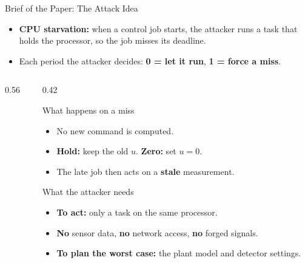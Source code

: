 \documentclass[9pt,aspectratio=169]{beamer}
\begin{document}
\begin{frame}{Brief of the Paper: The Attack Idea}
\begin{itemize}
  \item \textbf{CPU starvation:} when a control job starts, the attacker runs a task that holds the processor, so the job misses its deadline.
  \item Each period the attacker decides: \textcolor{hitgreen!80!black}{\textbf{0 = let it run}}, \textcolor{missred}{\textbf{1 = force a miss}}.
\end{itemize}
\vspace{0.2em}
\begin{columns}[T]
\begin{column}{0.56\textwidth}
\centering
\FigTimeline
\end{column}
\begin{column}{0.42\textwidth}
\begin{block}{What happens on a miss}
\begin{itemize}
  \item No new command is computed.
  \item \textbf{Hold:} keep the old $u$. \quad \textbf{Zero:} set $u=0$.
  \item The late job then acts on a \textbf{stale} measurement.
\end{itemize}
\end{block}
\vspace{0.3em}
\begin{block}{What the attacker needs}
\begin{itemize}
  \item \textbf{To act:} only a task on the same processor.
  \item \textbf{No} sensor data, \textbf{no} network access, \textbf{no} forged signals.
  \item \textbf{To plan the worst case:} the plant model and detector settings.
\end{itemize}
\end{block}
\end{column}
\end{columns}
\end{frame}
\end{document}
